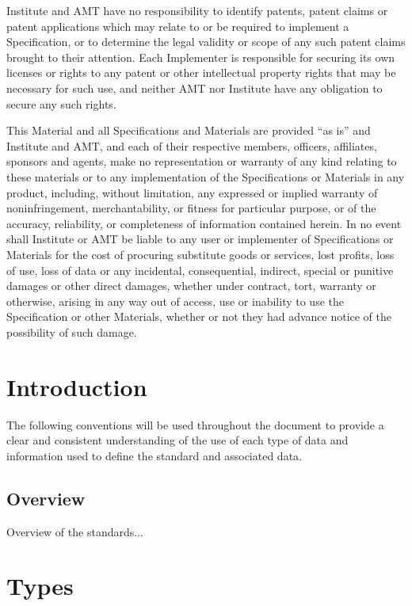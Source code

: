 \documentclass{mtconnect}	%
\begin{document}
\mtconnect Institute and AMT have no responsibility to identify patents, patent claims or patent applications which may relate to or be required to implement a Specification, or to determine the legal validity or scope of any such patent claims brought to their attention. Each \mtconnect Implementer is responsible for securing its own licenses or rights to any patent or other intellectual property rights that may be necessary for such use, and neither AMT nor \mtconnect Institute have any obligation to secure any such rights.

This Material and all \mtconnect Specifications and Materials are provided ``as is'' and \mtconnect Institute and AMT, and each of their respective members, officers, affiliates, sponsors and agents, make no representation or warranty of any kind relating to these materials or to any implementation of the \mtconnect Specifications or Materials in any product, including, without limitation, any expressed or implied warranty of noninfringement, merchantability, or fitness for particular purpose, or of the accuracy, reliability, or completeness of information contained herein. In no event shall \mtconnect Institute or AMT be liable to any user or implementer of \mtconnect Specifications or Materials for the cost of procuring substitute goods or services, lost profits, loss of use, loss of data or any incidental, consequential, indirect, special or punitive damages or other direct damages, whether under contract, tort, warranty or otherwise, arising in any way out of access, use or inability to use the \mtconnect Specification or other \mtconnect Materials, whether or not they had advance notice of the possibility of such damage.

\clearpage
\tableofcontents
\thispagestyle{fancy}
\clearpage
\listoffigures
\thispagestyle{fancy}
\clearpage
{}


\section{Introduction}\label{intro}

The following conventions will be used throughout the document to provide a clear and consistent understanding of the use of each type of data and information used to define the \mtconnect standard and associated data.

\subsection{Overview}\label{overview}

Overview of the standards...

\section{Types}\label{types}


\end{document}
